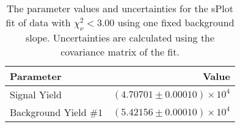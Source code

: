 
\begin{table}[ht]
    \begin{center}
        \begin{tabular}{lr}\toprule
            Parameter & Value \\\midrule
            Signal Yield & $(4.70701 \pm 0.00010) \times 10^{4}$ \\
            Background Yield $\#1$ & $(5.42156 \pm 0.00010) \times 10^{4}$ \\\bottomrule
        \end{tabular}
        \caption{The parameter values and uncertainties for the sPlot fit of data with $\chi^2_\nu < 3.00$ using one fixed background slope. Uncertainties are calculated using the covariance matrix of the fit.}\label{tab:splot-fit-results-chisqdof-3.00-fixed-1}
    \end{center}
\end{table}
